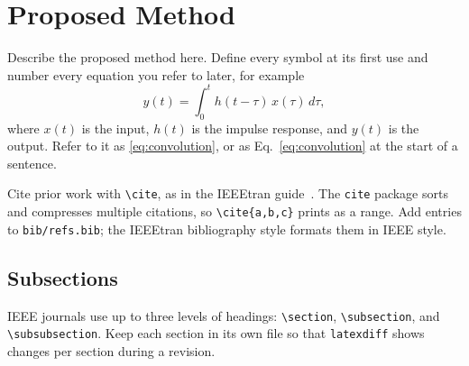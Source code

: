 \section{Proposed Method}
\label{sec:method}

Describe the proposed method here. Define every symbol at its first use and number every equation you refer to later, for example
\begin{equation}
  y(t) = \int_{0}^{t} h(t-\tau)\, x(\tau)\, d\tau ,
  \label{eq:convolution}
\end{equation}
where $x(t)$ is the input, $h(t)$ is the impulse response, and $y(t)$ is the output. Refer to it as \eqref{eq:convolution}, or as Eq.~\eqref{eq:convolution} at the start of a sentence.

Cite prior work with \verb|\cite|, as in the IEEEtran guide~\cite{shell2015ieeetran}. The \texttt{cite} package sorts and compresses multiple citations, so \verb|\cite{a,b,c}| prints as a range. Add entries to \texttt{bib/refs.bib}; the IEEEtran bibliography style formats them in IEEE style.

\subsection{Subsections}
IEEE journals use up to three levels of headings: \verb|\section|, \verb|\subsection|, and \verb|\subsubsection|. Keep each section in its own file so that \texttt{latexdiff} shows changes per section during a revision.
